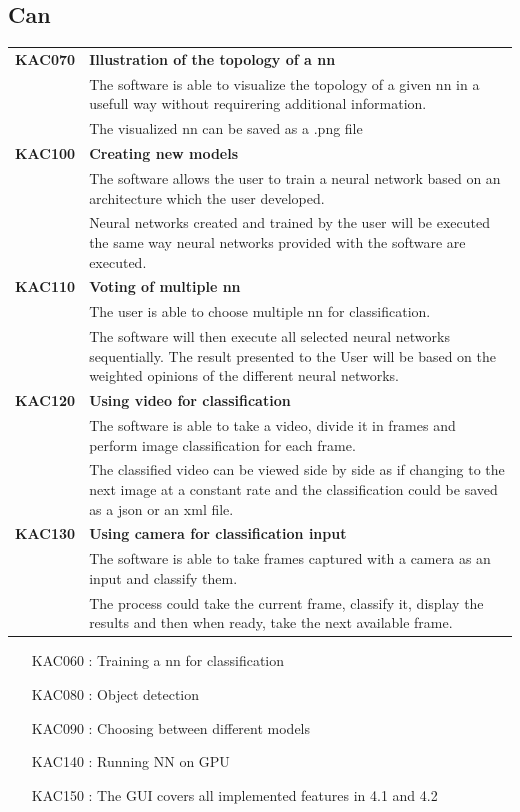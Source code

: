 \documentclass[parskip=full]{scrartcl}
\begin{document}
\subsection{Can}
\begin{tabular}{p{2cm}p{12cm}}
\textbf{KAC070} & \textbf{Illustration of the topology of a nn} \\
& The software is able to visualize the topology of a given nn in a usefull way without requirering additional information. \\
& The visualized nn can be saved as a .png file\\
\textbf{KAC100} & \textbf{Creating new models} \\
& The software allows the user to train a neural network based on an architecture which the user developed.\\
& Neural networks created and trained by the user will be executed the same way neural networks provided with the software are executed.\\
\textbf{KAC110} & \textbf{Voting of multiple nn} \\
& The user is able to choose multiple nn for classification.\\
& The software will then execute all selected neural networks sequentially. The result presented to the User will be based on the weighted opinions of the different neural networks.\\
\textbf{KAC120} & \textbf{Using video for classification} \\
& The software is able to take a video, divide it in frames and perform image classification for each frame.\\
& The classified video can be viewed side by side as if changing to the next image at a constant rate and the classification could be saved as a \gls{json} or an \gls{xml} file.\\
\textbf{KAC130} & \textbf{Using camera for classification input} \\
& The software is able to take frames captured with a camera as an input and classify them.\\
& The process could take the current frame, classify it, display the results and then when ready, take the next available frame.
\end{tabular}
\begin{itemize}[nosep]
\item [KAC060]: Training a nn for classification
\item [KAC080]: Object detection
\item [KAC090]: Choosing between different models
\item [KAC140]: Running NN on GPU
\item [KAC150]: The GUI covers all implemented features in 4.1 and 4.2
\end{itemize}
\end{document}
